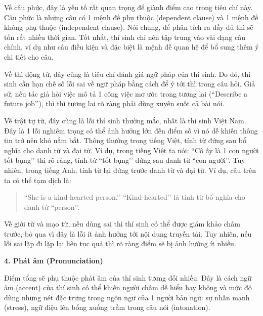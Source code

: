 \vspace{.25cm}
Về câu phức, đây là yếu tố rất quan trọng để giành điểm cao trong tiêu chí này. Câu phức là những câu có 1 mệnh đề phụ thuộc (dependent clause) và 1 mệnh đề không phụ thuộc (independent clause). Nói chung, để phân tích ra đầy đủ thì sẽ tốn rất nhiều thời gian. Tốt nhất, thí sinh chỉ nên tập trung vào vài dạng câu chính, ví dụ như câu điều kiện và đặc biệt là mệnh đề quan hệ để bổ sung thêm ý chi tiết cho câu.  

\vspace{.25cm}
Về thì động từ, đây cũng là tiêu chí đánh giá ngữ pháp của thí sinh. Do đó, thí sinh cần hạn chế số lỗi sai về ngữ pháp bằng cách để ý tới thì trong câu hỏi. Giả sử, nếu tác giả hỏi việc mô tả 1 công việc mơ ước trong tương lai (``Describe a future job’’), thì thì tương lai rõ ràng phải dùng xuyên suốt cả bài nói.  

\vspace{.25cm}
Về trật tự từ, đây cũng là lỗi thí sinh thường mắc, nhất là thí sinh Việt Nam. Đây là 1 lỗi nghiêm trọng có thể ảnh hưởng lớn đến điểm số vì nó dễ khiến thông tin trở nên khó nắm bắt. Thông thường trong tiếng Việt, tính từ đứng sau bổ nghĩa cho danh từ và đại từ. Ví dụ, trong tiếng Việt ta nói: ``Cô ấy là 1 con người tốt bụng’’ thì rõ ràng, tính từ ``tốt bụng’’ đứng sau danh từ ``con người’’. Tuy nhiên, trong tiếng Anh, tính từ lại đứng trước danh từ và đại từ. Ví dụ, câu trên ta có thể tạm dịch là:  
\begin{quote}
``She is a kind-hearted person.’’   ``Kind-hearted’’ là tính từ bổ nghĩa cho danh từ ``person’’.  
\end{quote}  


\vspace{.25cm}
Về giới từ và mạo từ, nếu dùng sai thì thí sinh có thể được giám khảo châm trước, bỏ qua vì đây là lỗi ít ảnh hưởng tới nội dung truyền tải. Tuy nhiên, nếu lỗi sai lặp đi lặp lại liên tục quá thì rõ ràng điểm sẽ bị ảnh hưởng ít nhiều.  


\vspace{.25cm}
\textbf{4. Phát âm (Pronunciation)}  

\vspace{.25cm}
Điểm tổng sẽ phụ thuộc phát âm của thí sinh tương đối nhiều. Đây là cách ngữ âm (accent) của thí sinh có thể khiến người chấm dễ hiểu hay không và mức độ dùng những nét đặc trưng trong ngôn ngữ của 1 người bản ngữ: sự nhấn mạnh (stress), ngữ điệu lên bổng xuống trầm trong câu nói (intonation).  

